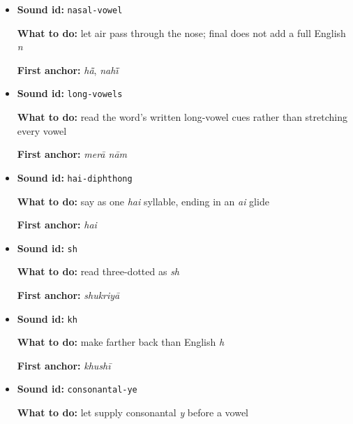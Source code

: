 \begin{itemize}
\begin{minipage}[t]{\linewidth}
  \end{minipage}
  \item \begin{minipage}[t]{\linewidth}
  \textbf{Sound id:} \texttt{nasal-vowel}
  \par \textbf{What to do:} let air pass through the nose; final \textbf{} does not add a full English \emph{n}
  \par \textbf{First anchor:} \textbf{} \emph{hā̃}, \textbf{} \emph{nahī̃}
  \end{minipage}
  \item \begin{minipage}[t]{\linewidth}
  \textbf{Sound id:} \texttt{long-vowels}
  \par \textbf{What to do:} read the word's written long-vowel cues rather than stretching every vowel
  \par \textbf{First anchor:} \textbf{ } \emph{merā nām}
  \end{minipage}
  \item \begin{minipage}[t]{\linewidth}
  \textbf{Sound id:} \texttt{hai-diphthong}
  \par \textbf{What to do:} say \textbf{} as one \emph{hai} syllable, ending in an \emph{ai} glide
  \par \textbf{First anchor:} \textbf{} \emph{hai}
  \end{minipage}
  \item \begin{minipage}[t]{\linewidth}
  \textbf{Sound id:} \texttt{sh}
  \par \textbf{What to do:} read three-dotted \textbf{} as \emph{sh}
  \par \textbf{First anchor:} \textbf{} \emph{shukriyā}
  \end{minipage}
  \item \begin{minipage}[t]{\linewidth}
  \textbf{Sound id:} \texttt{kh}
  \par \textbf{What to do:} make \textbf{} farther back than English \emph{h}
  \par \textbf{First anchor:} \textbf{} \emph{khushī}
  \end{minipage}
  \item \begin{minipage}[t]{\linewidth}
  \textbf{Sound id:} \texttt{consonantal-ye}
  \par \textbf{What to do:} let \textbf{} supply consonantal \emph{y} before a vowel

\end{minipage}
\end{itemize}
